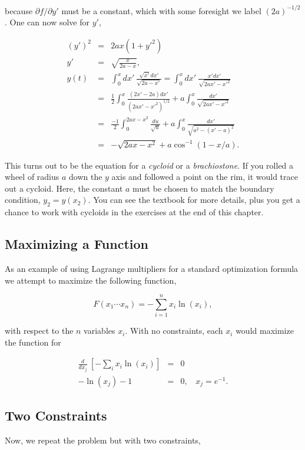 \documentclass[%
oneside,                 %
final,                   %
10pt]{article}
\begin{document}
because $\partial f/\partial y'$ must be a constant, which with some
foresight we label $(2a)^{-1/2}$. One can now solve for $y'$,

\begin{eqnarray*}
(y')^2&=&2ax(1+y'^2)\\
\nonumber
y'&=&\sqrt{\frac{x}{2a-x}},\\
\nonumber
y(t)&=&\int_0^x dx'~\frac{\sqrt{x'}dx'}{\sqrt{2a-x'}}=\int_0^x dx'~\frac{x'dx'}{\sqrt{2ax'-x'^2}}\\
\nonumber
&=&\frac{1}{2}\int_0^x\frac{(2x'-2a)dx'}{(2ax'-x'^2)^{1/2}}+a\int_0^x\frac{dx'}{\sqrt{2ax'-x'^2}}\\
\nonumber
&=&\frac{-1}{2}\int_0^{2ax-x^2}\frac{du}{\sqrt{u}}+a\int_0^x\frac{dx'}{\sqrt{a^2-(x'-a)^2}}\\
&=&-\sqrt{2ax-x^2}+a\cos^{-1}(1-x/a).
\end{eqnarray*}

This turns out to be the equation for a {\it cycloid} or a {\it
brachiostone}. If you rolled a wheel of radius $a$ down the $y$ axis
and followed a point on the rim, it would trace out a cycloid. Here,
the constant $a$ must be chosen to match the boundary condition,
$y_2=y(x_2)$. You can see the textbook for more details, plus you get
a chance to work with cycloids in the exercises at the end of this
chapter.

\subsection{Maximizing a Function}

As an example of using Lagrange multipliers for a standard
optimization formula we attempt to maximize the following function,

\[
F(x_1\cdots x_n)=-\sum_{i=1}^n x_i\ln(x_i), 
\]

with respect to the $n$ variables $x_i$. With no constraints, each
$x_i$ would maximize the function for

\begin{eqnarray*}
\frac{d}{dx_j}~\left[-\sum_i x_i\ln(x_i)\right]&=&0\\
-\ln(x_j)-1&=&0,~~~~x_j=e^{-1}.
\end{eqnarray*}

\subsection{Two Constraints}

Now, we repeat the problem but with two constraints,
\end{document}
